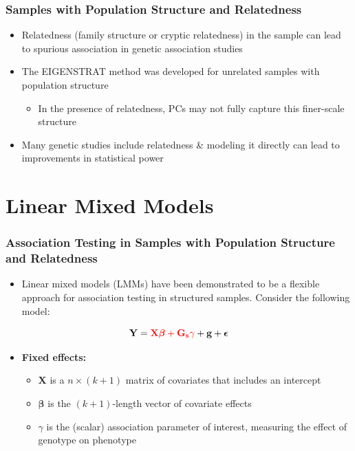 \documentclass{beamer}
\newcommand{\bg}{\mathbf{g}}
\newcommand{\bepsilon}{\mbox{\boldmath$\epsilon$}}
\begin{document}
\begin{frame}
\frametitle{\bf  Samples with Population Structure and Relatedness}
\begin{itemize}
\item Relatedness (family structure or cryptic relatedness) in the sample can lead to spurious association in genetic association studies 
\item The EIGENSTRAT method was developed for unrelated samples with population structure 
\begin{itemize}
	\item In the presence of relatedness, PCs may not fully capture this finer-scale structure
\end{itemize}
\item Many genetic studies include relatedness \& modeling it directly can lead to improvements in statistical power
\end{itemize}
\end{frame}


\section{Linear Mixed Models}


\begin{frame}
\frametitle{\bf Association Testing in Samples with Population Structure and Relatedness}
\vspace{-5pt}
\begin{itemize}
\item Linear mixed models (LMMs) have been demonstrated to be a flexible approach for association testing  in structured samples.  Consider the following model:
\end{itemize}
\begin{equation*}
\mathbf{Y}= {\color{red} \mathbf{X}\boldsymbol{\beta} + \mathbf{G_s}\gamma} +  \bg  + \bepsilon 
\end{equation*}

\begin{itemize}
\item {\bf Fixed effects:}
\begin{itemize}
\item  $\mathbf{X}$ is a $n \times (k+1)$ matrix of covariates that includes an intercept 
\item $\boldsymbol{\beta}$ is the $(k+1)$-length  vector of covariate effects
\item  $\gamma$ is the (scalar) association parameter of interest, measuring the effect of genotype on phenotype
\end{itemize}
\end{itemize}
\end{frame}
\end{document}
